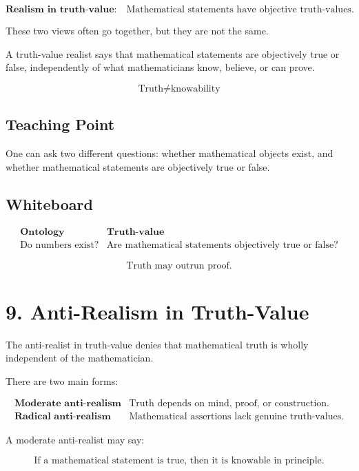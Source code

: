 \documentclass[11pt]{article}
\begin{document}
\[
\textbf{Realism in truth-value:}
\quad
\text{Mathematical statements have objective truth-values.}
\]

These two views often go together, but they are not the same.

A truth-value realist says that mathematical statements are objectively true or false,
independently of what mathematicians know, believe, or can prove.

\[
\text{Truth} \neq \text{knowability}
\]

\subsection*{Teaching Point}

One can ask two different questions: whether mathematical objects exist, and whether
mathematical statements are objectively true or false.

\subsection*{Whiteboard}

\[
\begin{array}{c|c}
\textbf{Ontology} & \textbf{Truth-value} \\
\hline
\text{Do numbers exist?} &
\text{Are mathematical statements objectively true or false?}
\end{array}
\]

\[
\text{Truth may outrun proof.}
\]

\section*{9. Anti-Realism in Truth-Value}

The anti-realist in truth-value denies that mathematical truth is wholly independent of the
mathematician.

There are two main forms:

\[
\begin{array}{c|c}
\textbf{Moderate anti-realism} &
\text{Truth depends on mind, proof, or construction.} \\
\textbf{Radical anti-realism} &
\text{Mathematical assertions lack genuine truth-values.}
\end{array}
\]

A moderate anti-realist may say:

\[
\text{If a mathematical statement is true, then it is knowable in principle.}
\]
\end{document}
